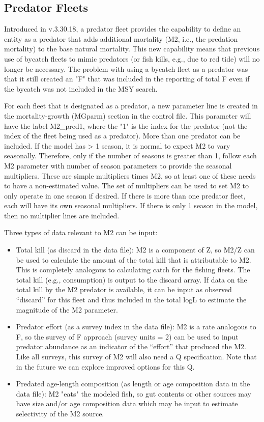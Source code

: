 \subsection{Predator Fleets}

Introduced in v.3.30.18, a predator fleet provides the capability to define an entity as a predator that adds additional mortality (M2, i.e., the predation mortality) to the base natural mortality. This new capability means that previous use of bycatch fleets to mimic predators (or fish kills, e.g., due to red tide) will no longer be necessary. The problem with using a bycatch fleet as a predator was that it still created an "F" that was included in the reporting of total F even if the bycatch was not included in the MSY search.

For each fleet that is designated as a predator, a new parameter line is created in the mortality-growth (MGparm) section in the control file. This parameter will have the label M2\_pred1, where the "1" is the index for the predator (not the index of the fleet being used as a predator). More than one predator can be included. If the model has > 1 season, it is normal to expect M2 to vary seasonally. Therefore, only if the number of seasons is greater than 1, follow each M2 parameter with number of season parameters to provide the seasonal multipliers. These are simple multipliers times M2, so at least one of these needs to have a non-estimated value. The set of multipliers can be used to set M2 to only operate in one season if desired. If there is more than one predator fleet, each will have its own seasonal multipliers. If there is only 1 season in the model, then no multiplier lines are included.

Three types of data relevant to M2 can be input:

\begin{itemize}
	\item Total kill (as discard in the data file): M2 is a component of Z, so M2/Z can be used to calculate the amount of the total kill that is attributable to M2. This is completely analogous to calculating catch for the fishing fleets. The total kill (e.g., consumption) is output to the discard array. If data on the total kill by the M2 predator is available, it can be input as observed “discard” for this fleet and thus included in the total logL to estimate the magnitude of the M2 parameter.
	
	\item Predator effort (as a survey index in the data file): M2 is a rate analogous to F, so the survey of F approach (survey units = 2) can be used to input predator abundance as an indicator of the “effort” that produced the M2. Like all surveys, this survey of M2 will also need a Q specification. Note that in the future we can explore improved options for this Q.
	
	\item Predated age-length composition (as length or age composition data in the data file): M2 "eats" the modeled fish, so gut contents or other sources may have size and/or age composition data which may be input to estimate selectivity of the M2 source. 
\end{itemize}

